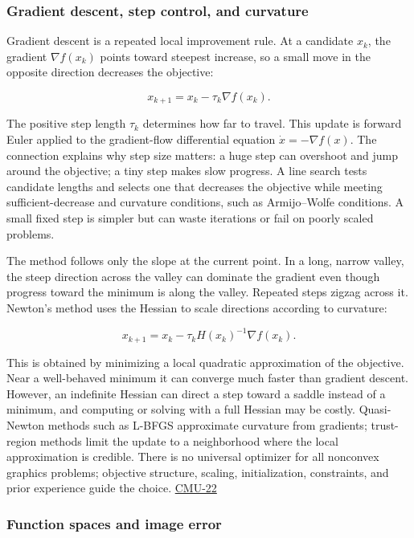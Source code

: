 \subsubsection{Gradient descent, step control, and curvature}\label{gradient-descent-step-control-and-curvature}

Gradient descent is a repeated local improvement rule. At a candidate \(x_k\), the gradient \(\nabla f(x_k)\) points toward steepest increase, so a small move in the opposite direction decreases the objective:

\[
x_{k+1}=x_k-\tau_k\nabla f(x_k).
\]

The positive step length \(\tau_k\) determines how far to travel. This update is forward Euler applied to the gradient-flow differential equation \(\dot x=-\nabla f(x)\). The connection explains why step size matters: a huge step can overshoot and jump around the objective; a tiny step makes slow progress. A line search tests candidate lengths and selects one that decreases the objective while meeting sufficient-decrease and curvature conditions, such as Armijo--Wolfe conditions. A small fixed step is simpler but can waste iterations or fail on poorly scaled problems.

The method follows only the slope at the current point. In a long, narrow valley, the steep direction across the valley can dominate the gradient even though progress toward the minimum is along the valley. Repeated steps zigzag across it. Newton's method uses the Hessian to scale directions according to curvature:

\[
x_{k+1}=x_k-\tau_k H(x_k)^{-1}\nabla f(x_k).
\]

This is obtained by minimizing a local quadratic approximation of the objective. Near a well-behaved minimum it can converge much faster than gradient descent. However, an indefinite Hessian can direct a step toward a saddle instead of a minimum, and computing or solving with a full Hessian may be costly. Quasi-Newton methods such as L-BFGS approximate curvature from gradients; trust-region methods limit the update to a neighborhood where the local approximation is credible. There is no universal optimizer for all nonconvex graphics problems; objective structure, scaling, initialization, constraints, and prior experience guide the choice. \hyperref[04-visual-computing-ii-ch036]{CMU-22}

\subsubsection{Function spaces and image error}\label{function-spaces-and-image-error}

